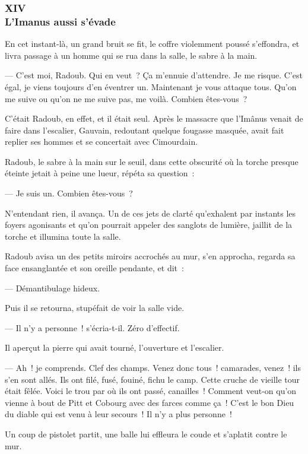 \documentclass[french,twoside]{book} %
\begin{document}
 \subsubsection[{XIV. L’Imanus aussi s’évade}]{XIV \\
L’Imanus aussi s’évade}
\label{p3l4c14}
\noindent En cet instant-là, un grand bruit se fit, le coffre violemment poussé s’effondra, et livra passage à un homme qui se rua dans la salle, le sabre à la main.\par
— C’est moi, Radoub. Qui en veut ? Ça m’ennuie d’attendre. Je me risque. C’est égal, je viens toujours d’en éventrer un. Maintenant je vous attaque tous. Qu’on me suive ou qu’on ne me suive pas, me voilà. Combien êtes-vous ?\par
C’était Radoub, en effet, et il était seul. Après le massacre que l’Imânus venait de faire dans l’escalier, Gauvain, redoutant quelque fougasse masquée, avait fait replier ses hommes et se concertait avec Cimourdain.\par
Radoub, le sabre à la main sur le seuil, dans cette obscurité où la torche presque éteinte jetait à peine une lueur, répéta sa question :\par
— Je suis un. Combien êtes-vous ?\par
N’entendant rien, il avança. Un de ces jets de clarté qu’exhalent par instants les foyers agonisants et qu’on pourrait appeler des sanglots de lumière, jaillit de la torche et illumina toute la salle.\par
Radoub avisa un des petits miroirs accrochés au  mur, s’en approcha, regarda sa face ensanglantée et son oreille pendante, et dit :\par
— Démantibulage hideux.\par
Puis il se retourna, stupéfait de voir la salle vide.\par
— Il n’y a personne ! s’écria-t-il. Zéro d’effectif.\par
Il aperçut la pierre qui avait tourné, l’ouverture et l’escalier.\par
— Ah ! je comprends. Clef des champs. Venez donc tous ! camarades, venez ! ils s’en sont allés. Ils ont filé, fusé, fouiné, fichu le camp. Cette cruche de vieille tour était fêlée. Voici le trou par où ils ont passé, canailles ! Comment veut-on qu’on vienne à bout de Pitt et Cobourg avec des farces comme ça ! C’est le bon Dieu du diable qui est venu à leur secours ! Il n’y a plus personne !\par
Un coup de pistolet partit, une balle lui effleura le coude et s’aplatit contre le mur.\par
\end{document}
